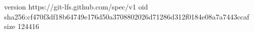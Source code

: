 version https://git-lfs.github.com/spec/v1
oid sha256:cf470f3df18b64749e176d50a3708802026d71286d312f0184e08a7a7443ccaf
size 124416
